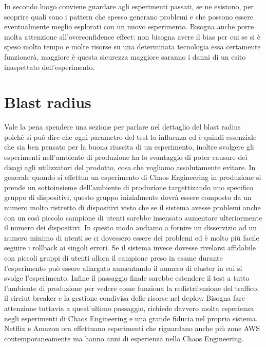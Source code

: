 In secondo luogo conviene guardare agli esperimenti passati, se ne esistono, per scoprire quali sono i pattern che spesso generano problemi e che possono essere eventualmente meglio esplorati con un nuovo esperimento.
Bisogna anche porre molta attenzione all'overconfidence effect: non bisogna avere il bias per cui se si è speso molto tempo e molte risorse su una determinata tecnologia essa certamente funzionerà, maggiore è questa sicurezza maggiore saranno i danni di un esito inaspettato dell'esperimento.

\section{Blast radius}
Vale la pena spendere una sezione per parlare nel dettaglio del blast radius poichè si può dire che ogni parametro del test lo influenza ed è quindi essenziale che sia ben pensato per la buona riuscita di un esperimento, inoltre svolgere gli esperimenti nell'ambiente di produzione ha lo svantaggio di poter causare dei disagi agli utilizzatori del prodotto, cosa che vogliamo assolutamente evitare.
In generale quando si effettua un esperimento di Chaos Engineering in produzione si prende un sottoinsieme dell'ambiente di produzione targettizando uno specifico gruppo di dispositivi, questo gruppo inizialmente dovrà essere composto da un numero molto ristretto di dispositivi visto che se il sistema avesse problemi anche con un così piccolo campione di utenti sarebbe insensato aumentare ulteriormente il numero dei dispositivi.
In questo modo andiamo a fornire un disservizio ad un numero minimo di utenti se ci dovessero essere dei problemi ed è molto più facile seguire i rollback ai singoli errori.
Se il sistema invece dovesse rivelarsi affidabile con piccoli gruppi di utenti allora il campione preso in esame durante l'esperimento può essere allargato aumentando il numero di cluster in cui si svolge l'esperimento.
Infine il passaggio finale sarebbe estendere il test a tutto l'ambiente di produzione per vedere come funziona la redistribuzione del traffico, il circiut breaker e la gestione condivisa delle risorse nel deploy.
Bisogna fare attenzione tuttavia a quest'ultimo passaggio, richiede davvero molta esperienza negli esperimenti di Chaos Engineering e una grande fiducia nel proprio sistema.
Netflix e Amazon ora effettuano esperimenti che riguardano anche più zone AWS contemporaneamente ma hanno anni di esperienza nella Chaos Engineering.

